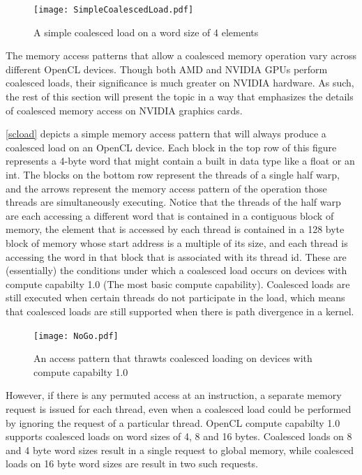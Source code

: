 \documentclass[12pt,twoside]{reedthesis}
\begin{document}
\begin{figure}[h!]
\texttt{[image: SimpleCoalescedLoad.pdf]}
\caption{A simple coalesced load on a word size of 4 elements}
\end{figure}
\label{scload}
\vspace{1pc}

The memory access patterns that allow a coalesced memory operation vary across different OpenCL devices. Though both AMD and NVIDIA GPUs perform coalesced loads, their significance is much greater on NVIDIA hardware. As such, the rest of this section will present the topic in a way that emphasizes the details of coalesced memory access on NVIDIA graphics cards.

\ref{scload} depicts a simple memory access pattern that will always produce a coalesced load on an OpenCL device. Each block in the top row of this figure represents a 4-byte word that might contain a built in data type like a float or an int. The blocks on the bottom row represent the threads of a single half warp, and the arrows represent the memory access pattern of the operation those threads are simultaneously executing. Notice that the threads of the half warp are each accessing a different word that is contained in a contiguous block of memory, the element that is accessed by each thread is contained in a 128 byte block of memory whose start address is a multiple of its size, and each thread is accessing the word in that block that is associated with its thread id.
These are (essentially) the conditions under which a coalesced load occurs on devices with compute capabilty 1.0 (The most basic compute capability). Coalesced loads are still executed when certain threads do not participate in the load, which means that coalesced loads are still supported when there is path divergence in a kernel.

\begin{figure}[h!]
\texttt{[image: NoGo.pdf]}
\caption{An access pattern that thrawts coalesced loading on devices with compute capabilty 1.0}
\end{figure}
\label{nogo}
\vspace{1pc}

However, if there is any permuted access at an instruction, a separate memory request is issued for each thread, even when a coalesced load could be performed by ignoring the request of a particular thread. OpenCL compute capabilty 1.0 supports coalesced loads on word sizes of 4, 8 and 16 bytes. Coalesced loads on 8 and 4 byte word sizes result in a single request to global memory, while coalesced loads on 16 byte word sizes are result in two such requests. 
\end{document}
